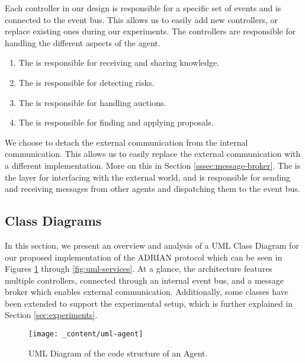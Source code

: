 Each controller in our design is responsible for a specific set of events and is connected to the event bus. This allows us to easily add new controllers, or replace existing ones during our experiments. The controllers are responsible for handling the different aspects of the agent. 

\begin{enumerate}
    \item The  is responsible for receiving and sharing knowledge. 
    \item The  is responsible for detecting risks.
    \item The  is responsible for handling auctions. 
    \item The  is responsible for finding and applying proposals.
\end{enumerate}

We choose to detach the external communication from the internal communication. This allows us to easily replace the external communication with a different implementation. More on this in Section \ref{sssec:message-broker}.
The  is the layer for interfacing with the external world, and is responsible for sending and receiving messages from other agents and dispatching them to the event bus.

\subsection{Class Diagrams}
\label{ssec:class-diagrams}

In this section, we present an overview and analysis of a UML Class Diagram for our proposed implementation of the ADRIAN protocol which can be seen in Figures \ref{fig:uml-agent} through \ref{fig:uml-services}. At a glance, the architecture features multiple controllers, connected through an internal event bus, and a message broker which enables external communication. Additionally, some classes have been extended to support the experimental setup, which is further explained in Section \ref{sec:experiments}.

\begin{figure}[H]
    \centering
    \texttt{[image: \_content/uml-agent]}
    \caption{UML Diagram of the code structure of an Agent.}
    \label{fig:uml-agent}
\end{figure}

